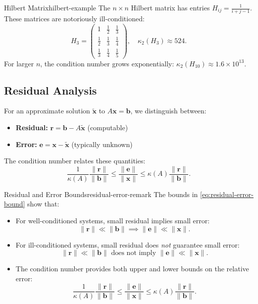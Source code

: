 \begin{example}{Hilbert Matrix}{hilbert-example}
    The $n \times n$ Hilbert matrix has entries $H_{ij} = \frac{1}{i+j-1}$. These matrices are notoriously ill-conditioned:
    \[
        H_3 = \begin{pmatrix}
            1           & \frac{1}{2} & \frac{1}{3} \\
            \frac{1}{2} & \frac{1}{3} & \frac{1}{4} \\
            \frac{1}{3} & \frac{1}{4} & \frac{1}{5}
        \end{pmatrix}, \quad \kappa_2(H_3) \approx 524.
    \]
    For larger $n$, the condition number grows exponentially: $\kappa_2(H_{10}) \approx 1.6 \times 10^{13}$.
\end{example}

\subsection{Residual Analysis}
For an approximate solution $\tilde{\mathbf{x}}$ to $A\mathbf{x} = \mathbf{b}$, we distinguish between:
\begin{itemize}
    \item \textbf{Residual:} $\mathbf{r} = \mathbf{b} - A\tilde{\mathbf{x}}$ (computable)
    \item \textbf{Error:} $\mathbf{e} = \mathbf{x} - \tilde{\mathbf{x}}$ (typically unknown)
\end{itemize}

The condition number relates these quantities:
\begin{equation}
    \frac{1}{\kappa(A)} \frac{\|\mathbf{r}\|}{\|\mathbf{b}\|} \leq \frac{\|\mathbf{e}\|}{\|\mathbf{x}\|} \leq \kappa(A) \frac{\|\mathbf{r}\|}{\|\mathbf{b}\|}.
    \label{eq:residual-error-bound}
\end{equation}

\begin{remark}{Residual and Error Bounds}{residual-error-remark}
    The bounds in \eqref{eq:residual-error-bound} show that:
    \begin{itemize}
        \item For well-conditioned systems, small residual implies small error:
              \[
                  \|\mathbf{r}\| \ll \|\mathbf{b}\| \implies \|\mathbf{e}\| \ll \|\mathbf{x}\|.
              \]
        \item For ill-conditioned systems, small residual does \emph{not} guarantee small error:
              \[
                  \|\mathbf{r}\| \ll \|\mathbf{b}\| \text{ does not imply } \|\mathbf{e}\| \ll \|\mathbf{x}\|.
              \]
        \item The condition number provides both upper and lower bounds on the relative error:
              \[
                  \frac{1}{\kappa(A)} \frac{\|\mathbf{r}\|}{\|\mathbf{b}\|} \leq \frac{\|\mathbf{e}\|}{\|\mathbf{x}\|} \leq \kappa(A) \frac{\|\mathbf{r}\|}{\|\mathbf{b}\|}.
              \]
    \end{itemize}
\end{remark}
